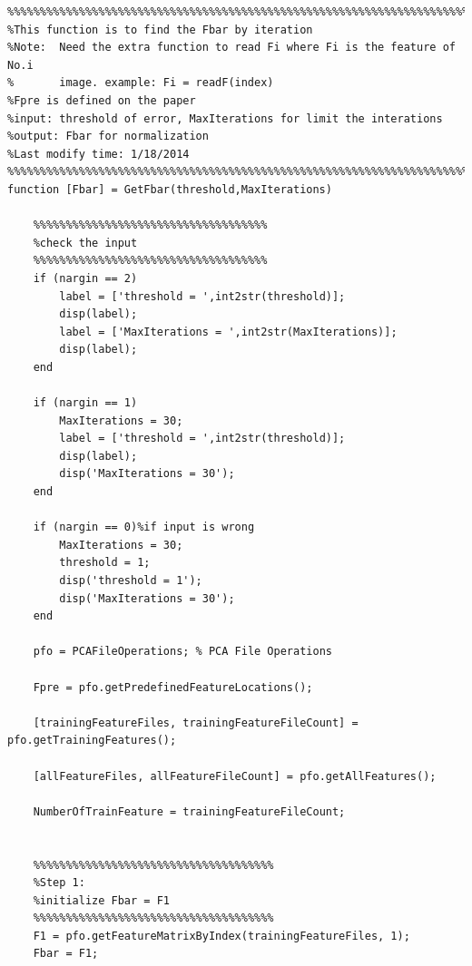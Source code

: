 \documentclass[]{article}
\begin{document}
\begin{verbatim}
%%%%%%%%%%%%%%%%%%%%%%%%%%%%%%%%%%%%%%%%%%%%%%%%%%%%%%%%%%%%%%%%%%%%%%%%%%%
%This function is to find the Fbar by iteration
%Note:  Need the extra function to read Fi where Fi is the feature of No.i
%       image. example: Fi = readF(index)
%Fpre is defined on the paper
%input: threshold of error, MaxIterations for limit the interations
%output: Fbar for normalization
%Last modify time: 1/18/2014
%%%%%%%%%%%%%%%%%%%%%%%%%%%%%%%%%%%%%%%%%%%%%%%%%%%%%%%%%%%%%%%%%%%%%%%%%%%
function [Fbar] = GetFbar(threshold,MaxIterations)

    %%%%%%%%%%%%%%%%%%%%%%%%%%%%%%%%%%%%
    %check the input
    %%%%%%%%%%%%%%%%%%%%%%%%%%%%%%%%%%%%    
    if (nargin == 2)
        label = ['threshold = ',int2str(threshold)];
        disp(label);
        label = ['MaxIterations = ',int2str(MaxIterations)];
        disp(label);
    end

    if (nargin == 1)
        MaxIterations = 30;
        label = ['threshold = ',int2str(threshold)];
        disp(label);
        disp('MaxIterations = 30');
    end
    
    if (nargin == 0)%if input is wrong
        MaxIterations = 30;
        threshold = 1;
        disp('threshold = 1');
        disp('MaxIterations = 30');
    end
    
    pfo = PCAFileOperations; % PCA File Operations
    
    Fpre = pfo.getPredefinedFeatureLocations();
    
    [trainingFeatureFiles, trainingFeatureFileCount] = pfo.getTrainingFeatures();
    
    [allFeatureFiles, allFeatureFileCount] = pfo.getAllFeatures();
    
    NumberOfTrainFeature = trainingFeatureFileCount;
    
    
    %%%%%%%%%%%%%%%%%%%%%%%%%%%%%%%%%%%%%
    %Step 1: 
    %initialize Fbar = F1
    %%%%%%%%%%%%%%%%%%%%%%%%%%%%%%%%%%%%%
    F1 = pfo.getFeatureMatrixByIndex(trainingFeatureFiles, 1);
    Fbar = F1;
    

\end{verbatim}
\end{document}

